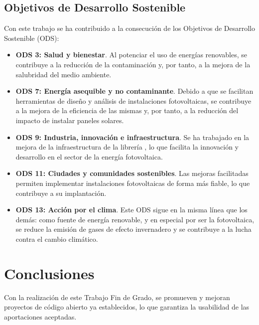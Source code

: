 
\subsection{Objetivos de Desarrollo Sostenible} \label{sssct:impacto:ods}

Con este trabajo se ha contribuido a la consecución de los Objetivos de Desarrollo Sostenible (ODS):

\begin{itemize}
    \item \textbf{ODS 3: Salud y bienestar}. Al potenciar el uso de energías renovables, se contribuye a la reducción de la contaminación y, por tanto, a la mejora de la salubridad del medio ambiente.
    \item \textbf{ODS 7: Energía asequible y no contaminante}. Debido a que se facilitan herramientas de diseño y análisis de instalaciones fotovoltaicas, se contribuye a la mejora de la eficiencia de las mismas y, por tanto, a la reducción del impacto de instalar paneles solares.
    \item \textbf{ODS 9: Industria, innovación e infraestructura}. Se ha trabajado en la mejora de la infraestructura de la librería \pvlibpy, lo que facilita la innovación y desarrollo en el sector de la energía fotovoltaica.
    \item \textbf{ODS 11: Ciudades y comunidades sostenibles}. Las mejoras facilitadas permiten implementar instalaciones fotovoltaicas de forma más fiable, lo que contribuye a su implantación.
    \item \textbf{ODS 13: Acción por el clima}. Este ODS sigue en la misma línea que los demás: como fuente de energía renovable, y en especial por ser la fotovoltaica, se reduce la emisión de gases de efecto invernadero y se contribuye a la lucha contra el cambio climático.
\end{itemize}



\section{Conclusiones} \label{sct:resultados:conclusiones}

Con la realización de este Trabajo Fin de Grado, se promueven y mejoran proyectos de código abierto ya establecidos, lo que garantiza la usabilidad de las aportaciones aceptadas.

